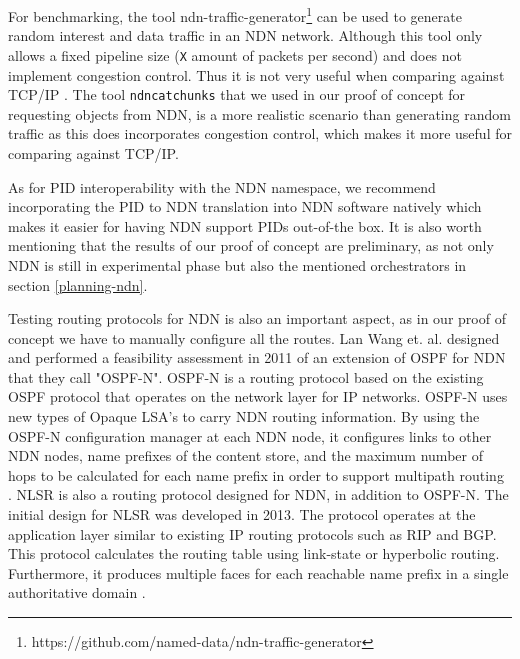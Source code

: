 For benchmarking, the tool ndn-traffic-generator\footnote{https://github.com/named-data/ndn-traffic-generator} can be used to generate random interest and data traffic in an NDN network. Although this tool only allows a fixed pipeline size (\texttt{X} amount of packets per second) and does not implement congestion control. Thus it is not very useful when comparing against TCP/IP \cite{ndnput-mem}. The tool \texttt{ndncatchunks} that we used in our proof of concept for requesting objects from NDN, is a more realistic scenario than generating random traffic as this does incorporates congestion control, which makes it more useful for comparing against TCP/IP.

As for PID interoperability with the NDN namespace, we recommend incorporating the PID to NDN translation into NDN software natively which makes it easier for having NDN support PIDs out-of-the box. It is also worth mentioning that the results of our proof of concept are preliminary, as not only NDN is still in experimental phase but also the mentioned orchestrators in section \ref{planning-ndn}.
 
Testing routing protocols for NDN is also an important aspect, as in our proof of concept we have to manually configure all the routes. Lan Wang et. al. \cite{ndn-ospfn1} designed and performed a feasibility assessment in 2011 of an extension of OSPF for NDN that they call "OSPF-N". OSPF-N is a routing protocol based on the existing OSPF protocol that operates on the network layer for IP networks. OSPF-N uses new types of Opaque LSA's to carry NDN routing information. By using the OSPF-N configuration manager at each NDN node, it configures links to other NDN nodes, name prefixes of the content store, and the maximum number of hops to be calculated for each name prefix in order to support multipath routing \cite{ndn-ospfn2}. 
NLSR is also a routing protocol designed for NDN, in addition to OSPF-N. 
The initial design for NLSR was developed in 2013. The protocol operates at the application layer similar to existing IP routing protocols such as RIP and BGP. This protocol calculates the routing table using link-state or hyperbolic routing. Furthermore, it produces multiple faces for each reachable name prefix in a single authoritative domain \cite{nlsr}. 





